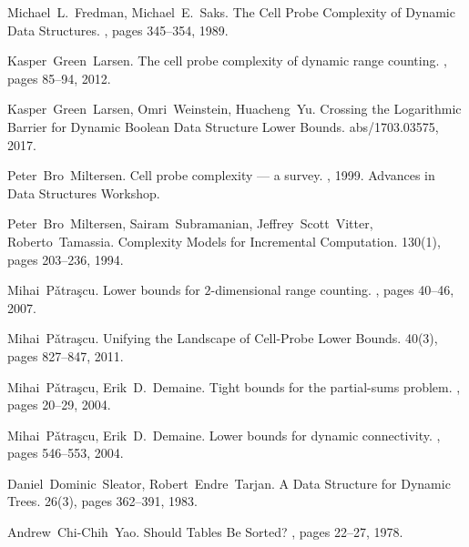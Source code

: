 \documentclass[11pt]{article}
\begin{document}
\begin{thebibliography}{FS89}

Michael~L.~Fredman, Michael~E.~Saks.
\newblock The Cell Probe Complexity of Dynamic Data Structures.
, pages 345--354, 1989.

Kasper~Green~Larsen.
\newblock The cell probe complexity of dynamic range counting. 
, pages 85--94, 2012.

Kasper~Green~Larsen, Omri~Weinstein, Huacheng~Yu.
\newblock Crossing the Logarithmic Barrier for Dynamic Boolean Data Structure Lower Bounds.
 abs/1703.03575, 2017.

Peter~Bro~Miltersen. 
\newblock Cell probe complexity --- a survey.
, 1999. Advances in Data Structures Workshop.

Peter~Bro~Miltersen, Sairam~Subramanian, Jeffrey~Scott~Vitter, Roberto~Tamassia.
\newblock Complexity Models for Incremental Computation.
 130(1), pages 203--236, 1994.

Mihai~P\v{a}tra\c{s}cu.
\newblock Lower bounds for $2$-dimensional range counting.
, pages 40--46, 2007.

Mihai~P\v{a}tra\c{s}cu.
\newblock Unifying the Landscape of Cell-Probe Lower Bounds.
 40(3), pages 827--847, 2011.

Mihai~P\v{a}tra\c{s}cu, Erik~D.~Demaine.
\newblock Tight bounds for the partial-sums problem.
, pages 20--29, 2004.

Mihai~P\v{a}tra\c{s}cu, Erik~D.~Demaine.
\newblock Lower bounds for dynamic connectivity. 
, pages 546--553, 2004.

Daniel~Dominic~Sleator, Robert~Endre~Tarjan.
\newblock A Data Structure for Dynamic Trees.
 26(3), pages 362--391, 1983.

Andrew~Chi-Chih~Yao.
\newblock Should Tables Be Sorted?
, pages 22--27, 1978.

\end{thebibliography}
\end{document}

